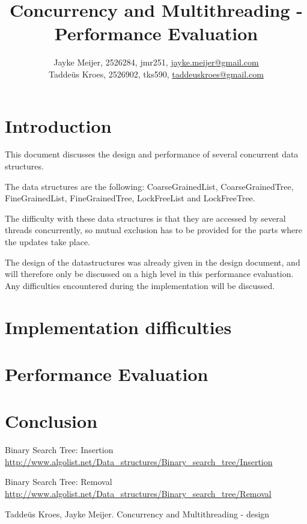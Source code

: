 \documentclass[a4paper]{article}
\title{Concurrency and Multithreading - Performance Evaluation}
\author{Jayke Meijer, 2526284, jmr251, \url{jayke.meijer@gmail.com} \\
Taddeüs Kroes, 2526902, tks590, \url{taddeuskroes@gmail.com}}
\begin{document}
\maketitle

\tableofcontents
\pagebreak

\section{Introduction}

This document discusses the design and performance of several
concurrent data structures.

The data structures are the following: CoarseGrainedList,
CoarseGrainedTree, FineGrainedList, FineGrainedTree,
LockFreeList and LockFreeTree.

The difficulty with these data structures is that they are accessed by several threads 
concurrently, so mutual exclusion has to be provided for the parts where the updates take 
place.

The design of the datastructures was already given in the design document\cite{design}, 
and will therefore only be discussed on a high level in this performance evaluation. Any
difficulties encountered during the implementation will be discussed.

\section{Implementation difficulties}

\section{Performance Evaluation}

\section{Conclusion}

\begin{thebibliography}{}

    Binary Search Tree: Insertion
    \url{http://www.algolist.net/Data_structures/Binary_search_tree/Insertion}
    
    Binary Search Tree: Removal
    \url{http://www.algolist.net/Data_structures/Binary_search_tree/Removal}
    
    Taddeüs Kroes, Jayke Meijer. Concurrency and Multithreading - design
  
\end{thebibliography}
\end{document}
